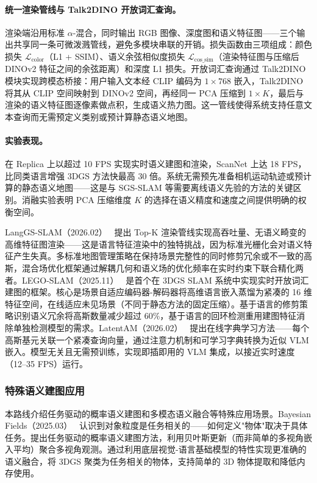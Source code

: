 \paragraph{统一渲染管线与 Talk2DINO 开放词汇查询。}
渲染端沿用标准 $\alpha$-混合，同时输出 RGB 图像、深度图和语义特征图——三个输出共享同一条可微泼溅管线，避免多模块串联的开销。损失函数由三项组成：颜色损失 $\mathcal{L}_{\text{color}}$（L1 + SSIM）、语义余弦相似度损失 $\mathcal{L}_{\text{cos\_sim}}$（渲染特征图与压缩后 DINOv2 特征之间的余弦距离）和深度 L1 损失。开放词汇查询通过 Talk2DINO 模块实现跨模态桥接：用户输入文本经 CLIP 编码为 $1 \times 768$ 嵌入，Talk2DINO 将其从 CLIP 空间映射到 DINOv2 空间，再经同一 PCA 压缩到 $1 \times K$，最后与渲染的语义特征图逐像素做点积，生成语义热力图。这一管线使得系统支持任意文本查询而无需预定义类别或预计算静态语义地图。

\paragraph{实验表现。}
在 Replica 上以超过 10 FPS 实现实时语义建图和渲染，ScanNet 上达 18 FPS，比同类语言增强 3DGS 方法快最高 30 倍。系统无需预先准备相机运动轨迹或预计算的静态语义地图——这是与 SGS-SLAM 等需要离线语义先验的方法的关键区别。消融实验表明 PCA 压缩维度 $K$ 的选择在语义精度和速度之间提供明确的权衡空间。

LangGS-SLAM（2026.02）~\cite{2602_06991} 提出 Top-K 渲染管线实现高吞吐量、无语义畸变的高维特征图渲染——这是语言特征渲染中的独特挑战，因为标准光栅化会对语义特征产生失真。多标准地图管理策略在保持场景完整性的同时修剪冗余或不一致的高斯，混合场优化框架通过解耦几何和语义场的优化频率在实时约束下联合精化两者。LEGO-SLAM（2025.11）~\cite{2511_16144} 是首个在 3DGS SLAM 系统中实现实时开放词汇建图的框架。核心是场景自适应编码器-解码器将高维语言嵌入蒸馏为紧凑的 16 维特征空间，在线适应未见场景（不同于静态方法的固定压缩）。基于语言的修剪策略识别语义冗余将高斯数量减少超过 60\%，基于语言的回环检测重用建图特征消除单独检测模型的需求。LatentAM（2026.02）~\cite{2602_12314} 提出在线字典学习方法——每个高斯基元关联一个紧凑查询向量，通过注意力机制和可学习字典转换为近似 VLM 嵌入。模型无关且无需预训练，实现即插即用的 VLM 集成，以接近实时速度（12--35 FPS）运行。

\subsubsection{特殊语义建图应用}

本路线介绍任务驱动的概率语义建图和多模态语义融合等特殊应用场景。Bayesian Fields（2025.03）~\cite{2503_05949} 认识到对象粒度是任务相关的——如何定义"物体"取决于具体任务。提出任务驱动的概率语义建图方法，利用贝叶斯更新（而非简单的多视角嵌入平均）聚合多视角观测。通过利用底层视觉-语言基础模型的特性实现更准确的语义融合，将 3DGS 聚类为任务相关的物体，支持简单的 3D 物体提取和降低内存使用。

